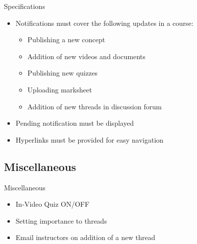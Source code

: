 \documentclass[xcolor=table]{beamer}
\begin{document}
\begin{frame}{Specifications}
	\begin{itemize}
		\item Notifications must cover the following updates in a course:
		\begin{itemize}
			\item Publishing a new concept
			\item Addition of new videos and documents
			\item Publishing new quizzes
			\item Uploading marksheet
			\item Addition of new threads in discussion forum
		\end{itemize}
		\item Pending notification must be displayed
		\item Hyperlinks must be provided for easy navigation
	\end{itemize}
\end{frame}

\subsection{Miscellaneous}

\begin{frame}{Miscellaneous}
	\begin{itemize}
		\item In-Video Quiz ON/OFF
		\item Setting importance to threads
		\item Email instructors on addition of a new thread
	\end{itemize}
\end{frame}

%
%


%
\end{document}
